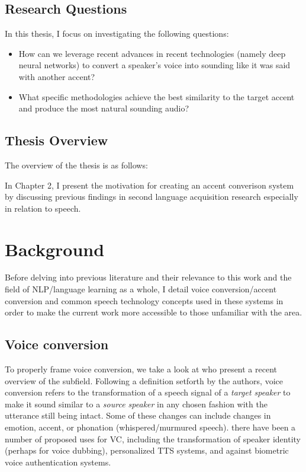 \documentclass
[
    a4paper,
    twoside,
    12pt
]
{report}
\begin{document}
\section{Research Questions}\label{research-questions}

In this thesis, I focus on investigating the following questions:

\begin{itemize}
\item
  How can we leverage recent advances in recent technologies (namely
  deep neural networks) to convert a speaker's voice into sounding like
  it was said with another accent?
\item
  What specific methodologies achieve the best similarity to the target
  accent and produce the most natural sounding audio?
\end{itemize}

\section{Thesis Overview}\label{thesis-overview}

The overview of the thesis is as follows:

In Chapter 2, I present the motivation for creating an accent converison
system by discussing previous findings in second language acquisition
research especially in relation to speech.
\cleardoublepage

\chapter{Background}

Before delving into previous literature and their relevance to this work
and the field of NLP/language learning as a whole, I detail voice
conversion/accent conversion and common speech technology concepts used
in these systems in order to make the current work more accessible to
those unfamiliar with the area.

\section{Voice conversion}\label{voice-conversion}

To properly frame voice conversion, we take a look at
\textcite{mohammadi2017} who present a recent overview of the subfield.
Following a definition setforth by the authors, voice conversion refers
to the transformation of a speech signal of a \emph{target speaker} to
make it sound similar to a \emph{source speaker} in any chosen fashion
with the utterance still being intact. Some of these changes can include
changes in emotion, accent, or phonation (whispered/murmured speech).
there have been a number of proposed uses for VC, including the
transformation of speaker identity (perhaps for voice dubbing),
personalized TTS systems, and against biometric voice authentication
systems.
\end{document}
